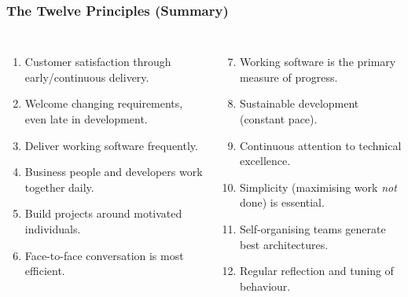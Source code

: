 \documentclass[xcolor=table]{beamer}
\begin{document}
\begin{frame}
    \frametitle{The Twelve Principles (Summary)}
    \footnotesize
    \begin{columns}
        \begin{enumerate}
            \item Customer satisfaction through early/continuous delivery.
            \item Welcome changing requirements, even late in development.
            \item Deliver working software frequently.
            \item Business people and developers work together daily.
            \item Build projects around motivated individuals.
            \item Face-to-face conversation is most efficient.
        \end{enumerate}
        
        \begin{enumerate}
            \setcounter{enumi}{6}
            \item Working software is the primary measure of progress.
            \item Sustainable development (constant pace).
            \item Continuous attention to technical excellence.
            \item Simplicity (maximising work \textit{not} done) is essential.
            \item Self-organising teams generate best architectures.
            \item Regular reflection and tuning of behaviour.
        \end{enumerate}
    \end{columns}
\end{frame}
\end{document}
